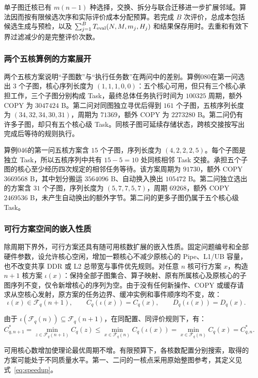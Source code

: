单子图迁核已有 $m(n-1)$ 种选择，交换、拆分与联合迁移进一步扩展邻域。算法因而按有限候选次序和实际评价成本分配预算。若完成 $B$ 次评价，总成本包括候选生成与预检，以及 $\sum_{j=1}^{B}T_{\rm eval}(N,M,m_j,H_j)$ 和结果保存用时。去重和有效下界过滤减少的是完整评价次数。

\subsubsection{两个五核算例的方案展开}
两个五核方案说明“子图数”与“执行任务数”在两问中的差别。算例080在第一问选出 $3$ 个子图，核心序列长度为 $(1,1,1,0,0)$：五个核心可用，但只有三个核心承担工作，三个子图分别构成 Task，最终总体任务执行时间为 $100325$ 周期，额外 COPY 为 $3047424$ B。第二问对同图独立寻优后得到 $161$ 个子图，五核序列长度为 $(34,32,34,30,31)$，周期为 $71369$，额外 COPY 为 $2273280$ B。第二问仍有许多子图，却只有五个核心级 Task。同核子图可延续存储状态，跨核交接按写出完成后等待的规则执行。

算例046的第一问五核方案含 $15$ 个子图，序列长度为 $(4,2,2,2,5)$。每个子图是独立 Task，所以五核序列中共有 $15-5=10$ 处同核相邻 Task 交接。承担五个子图的核心至少经历四次规定的相邻任务等待。该方案周期为 $91730$，额外 COPY $3669568$ B，其中划分搬运 $3564096$ B、自动换入换出 $105472$ B。第二问独立选出的方案含 $31$ 个子图，序列长度为 $(5,7,7,5,7)$，周期 $69268$，额外 COPY $2469536$ B，未产生自动换出的额外字节。第二问的更多子图仍属于五个核心级Task。

\subsubsection{可行方案空间的嵌入性质}
除周期下界外，可行方案还具有随可用核数扩展的嵌入性质。固定问题编号和全部硬件参数，设允许核心空闲，增加一颗核心不减少原核心的 Pipe、L1/UB 容量，也不改变共享 DDR 或 L2 总带宽与事件优先规则。对任意 $n$ 核可行方案 $x$，构造 $n+1$ 核方案 $\iota(x)$：保持全部子图集合、算子映射、原有所属核心及原核心的子图序列不变，仅令新增核心的序列为空。由于没有任何新操作、COPY 或缓存请求从空核心发射，原方案的任务边界、缓冲实例和事件顺序均不变，故：
\begin{equation}
 \iota(x)\in\mathcal F_q(n+1),\qquad
 C_q(\iota(x))=C_q(x),\qquad D_q(\iota(x))=D_q(x).
 \label{eq:core_embedding}
\end{equation}

由于 $\iota(\mathcal F_q(n))\subseteq\mathcal F_q(n+1)$，在同配置、同评价规则下，有：
\[
 C_{q,n+1}^{*}
 =\min_{z\in\mathcal F_q(n+1)}C_q(z)
 \le\min_{x\in\mathcal F_q(n)}C_q(\iota(x))
 =\min_{x\in\mathcal F_q(n)}C_q(x)=C_{q,n}^{*}.
\]

可用核心数增加使理论最优周期不增。有限预算下，各核数配置分别搜索，取得的方案可能处于不同质量水平。第一、二问的一核点采用原始整图参考，其定义见式~\eqref{eq:speedup}。
